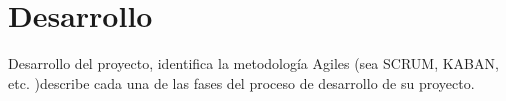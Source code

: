 \chapter{Desarrollo}
Desarrollo del proyecto, identifica la metodología  Agiles (sea SCRUM, KABAN, etc. )describe cada una de las fases del proceso de desarrollo de su proyecto. 
